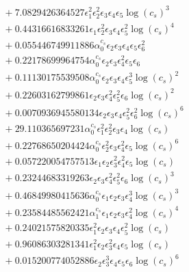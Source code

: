 \documentclass[10pt]{article}
\begin{document}
\begin{align*}
&{}  + 7.0829426364527 \epsilon_{1}^{2} \epsilon_{2}^{2} \epsilon_{3} \epsilon_{4} \epsilon_{5} \log{\left(c_{s} \right)}^{3} \\
&{}  + 0.44316616833261 \epsilon_{1} \epsilon_{2}^{2} \epsilon_{3} \epsilon_{4} \epsilon_{5}^{2} \log{\left(c_{s} \right)}^{4} \\
&{}  + 0.055446749911886 \alpha_{0}^{c_s} \epsilon_{2} \epsilon_{3} \epsilon_{4} \epsilon_{5} \epsilon_{6}^{2} \\
&{}  + 0.22178699964754 \alpha_{0}^{c_s} \epsilon_{2} \epsilon_{3} \epsilon_{4}^{2} \epsilon_{5} \epsilon_{6} \\
&{}  + 0.11130175539508 \alpha_{0}^{c_s} \epsilon_{2} \epsilon_{3} \epsilon_{4} \epsilon_{5}^{3} \log{\left(c_{s} \right)}^{2} \\
&{}  + 0.22603162799861 \epsilon_{2} \epsilon_{3} \epsilon_{4}^{2} \epsilon_{5}^{2} \epsilon_{6} \log{\left(c_{s} \right)}^{2} \\
&{}  + 0.0070936945580134 \epsilon_{2} \epsilon_{3} \epsilon_{4} \epsilon_{5}^{2} \epsilon_{6}^{2} \log{\left(c_{s} \right)}^{6} \\
&{}  + 29.110365697231 \alpha_{0}^{c_s} \epsilon_{1}^{2} \epsilon_{2}^{2} \epsilon_{3} \epsilon_{4} \log{\left(c_{s} \right)} \\
&{}  + 0.22768650204424 \alpha_{0}^{c_s} \epsilon_{2}^{2} \epsilon_{3} \epsilon_{4}^{2} \epsilon_{5} \log{\left(c_{s} \right)}^{6} \\
&{}  + 0.057220054757513 \epsilon_{1} \epsilon_{2} \epsilon_{3}^{2} \epsilon_{4}^{2} \epsilon_{5} \log{\left(c_{s} \right)} \\
&{}  + 0.23244683319263 \epsilon_{2} \epsilon_{3} \epsilon_{4}^{2} \epsilon_{5}^{2} \epsilon_{6} \log{\left(c_{s} \right)}^{3} \\
&{}  + 0.46849980415636 \alpha_{0}^{c_s} \epsilon_{1} \epsilon_{2} \epsilon_{3} \epsilon_{4}^{3} \log{\left(c_{s} \right)}^{3} \\
&{}  + 0.23584485562421 \alpha_{1}^{c_s} \epsilon_{1} \epsilon_{2} \epsilon_{3} \epsilon_{4}^{2} \log{\left(c_{s} \right)}^{4} \\
&{}  + 0.24021575820335 \epsilon_{1}^{2} \epsilon_{2} \epsilon_{3} \epsilon_{4} \epsilon_{5}^{2} \log{\left(c_{s} \right)} \\
&{}  + 0.96086303281341 \epsilon_{1}^{2} \epsilon_{2} \epsilon_{3}^{2} \epsilon_{4} \epsilon_{5} \log{\left(c_{s} \right)} \\
&{}  + 0.015200774052886 \epsilon_{2} \epsilon_{3}^{3} \epsilon_{4} \epsilon_{5} \epsilon_{6} \log{\left(c_{s} \right)}^{6} \\

\end{align*}
\end{document}
